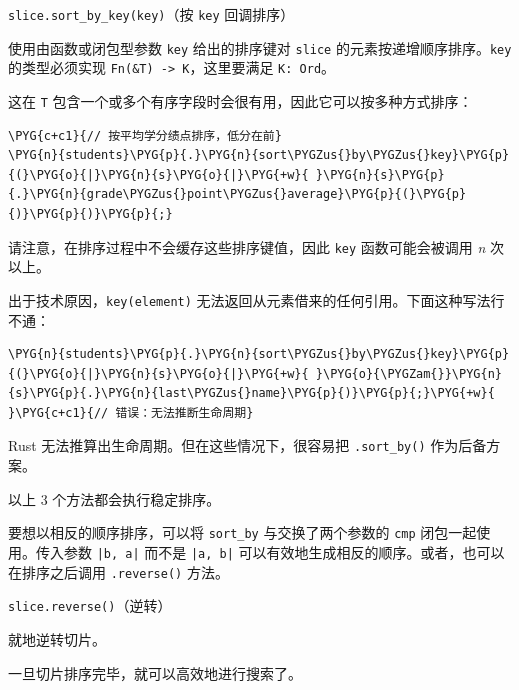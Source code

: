 \begin{myNote}
\texttt{slice.sort\_by\_key(key)}（按 \texttt{key} 回调排序）
\end{myNote}

使用由函数或闭包型参数 \texttt{key} 给出的排序键对 \texttt{slice} 的元素按递增顺序排序。\texttt{key} 的类型必须实现 \texttt{Fn(\&T) -> K}，这里要满足 \texttt{K: Ord}。

这在 \texttt{T} 包含一个或多个有序字段时会很有用，因此它可以按多种方式排序：

\begin{Verbatim}[commandchars=\\\{\},breaklines=true,breakanywhere=true,fontsize=\codefont,xleftmargin=17bp]
\PYG{c+c1}{// 按平均学分绩点排序，低分在前}
\PYG{n}{students}\PYG{p}{.}\PYG{n}{sort\PYGZus{}by\PYGZus{}key}\PYG{p}{(}\PYG{o}{|}\PYG{n}{s}\PYG{o}{|}\PYG{+w}{ }\PYG{n}{s}\PYG{p}{.}\PYG{n}{grade\PYGZus{}point\PYGZus{}average}\PYG{p}{(}\PYG{p}{)}\PYG{p}{)}\PYG{p}{;}
\end{Verbatim}

请注意，在排序过程中不会缓存这些排序键值，因此 \texttt{key} 函数可能会被调用 \emph{n} 次以上。

出于技术原因，\texttt{key(element)} 无法返回从元素借来的任何引用。下面这种写法行不通：

\begin{Verbatim}[commandchars=\\\{\},breaklines=true,breakanywhere=true,fontsize=\codefont,xleftmargin=17bp]
\PYG{n}{students}\PYG{p}{.}\PYG{n}{sort\PYGZus{}by\PYGZus{}key}\PYG{p}{(}\PYG{o}{|}\PYG{n}{s}\PYG{o}{|}\PYG{+w}{ }\PYG{o}{\PYGZam{}}\PYG{n}{s}\PYG{p}{.}\PYG{n}{last\PYGZus{}name}\PYG{p}{)}\PYG{p}{;}\PYG{+w}{  }\PYG{c+c1}{// 错误：无法推断生命周期}
\end{Verbatim}

Rust 无法推算出生命周期。但在这些情况下，很容易把 \texttt{.sort\_by()} 作为后备方案。

以上 3 个方法都会执行稳定排序。

要想以相反的顺序排序，可以将 \texttt{sort\_by} 与交换了两个参数的 \texttt{cmp} 闭包一起使用。传入参数 \texttt{|b, a|} 而不是 \texttt{|a, b|} 可以有效地生成相反的顺序。或者，也可以在排序之后调用 \texttt{.reverse()} 方法。

\begin{mySidenote}
\texttt{slice.reverse()}（逆转）
\end{mySidenote}

就地逆转切片。

一旦切片排序完毕，就可以高效地进行搜索了。

